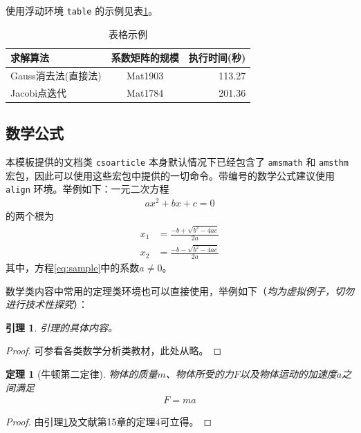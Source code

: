\documentclass[UTF8]{csoarticle}
\newtheorem{theorem}{定理}
\newtheorem{lemma}{引理}
\begin{document}
使用浮动环境 \verb|table| 的示例见表\ref{tab:sample}。
\begin{table}
  \caption{表格示例}
  \label{tab:sample}
  \centering
  \begin{tabular}{lcr}%
    \hline
    求解算法                & 系数矩阵的规模    & 执行时间(秒)  \\
    \hline
    Gauss消去法(直接法)     & Mat1903           &  113.27       \\
    Jacobi点迭代            & Mat1784           &  201.36       \\
    \hline
  \end{tabular}
\end{table}

\subsection{数学公式}

本模板提供的文档类 \verb|csoarticle| 本身默认情况下已经包含了 \verb|amsmath| 和 \verb|amsthm| 宏包，因此可以使用这些宏包中提供的一切命令。带编号的数学公式建议使用 \verb|align| 环境。举例如下：一元二次方程
\begin{align}\label{eq:sample}
    a x^2 + b x + c = 0
\end{align}
的两个根为
\begin{align}\label{eq:root}
    x_1 &= \frac{-b + \sqrt{b^2 - 4ac}}{2a} \\
    x_2 &= \frac{-b - \sqrt{b^2 - 4ac}}{2a}
\end{align}
其中，方程\eqref{eq:sample}中的系数$a \not= 0$。

数学类内容中常用的定理类环境也可以直接使用，举例如下（\emph{均为虚拟例子，切勿进行技术性探究}）：
\begin{lemma}\label{lem:levy}
    引理的具体内容。
\end{lemma}
\begin{proof}
    可参看各类数学分析类教材，此处从略。
\end{proof}

\begin{theorem}[牛顿第二定律]\label{thm:newton}
物体的质量$m$、物体所受的力$F$以及物体运动的加速度$a$之间满足
\begin{align}\label{eq:f-eq-ma}
    F = m a
\end{align}
\end{theorem}
\begin{proof}
由引理\ref{lem:levy}及文献\cite{bib1}第15章的定理4可立得。
\end{proof}
\end{document}
